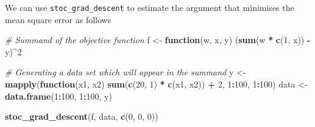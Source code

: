 \documentclass[12pt,]{article}
\newenvironment{Shaded}{\begin{snugshade}}{\end{snugshade}}
\newcommand{\CommentTok}[1]{\textcolor[rgb]{0.56,0.35,0.01}{\textit{#1}}}
\newcommand{\ControlFlowTok}[1]{\textcolor[rgb]{0.13,0.29,0.53}{\textbf{#1}}}
\newcommand{\DecValTok}[1]{\textcolor[rgb]{0.00,0.00,0.81}{#1}}
\newcommand{\KeywordTok}[1]{\textcolor[rgb]{0.13,0.29,0.53}{\textbf{#1}}}
\newcommand{\NormalTok}[1]{#1}
\newcommand{\OperatorTok}[1]{\textcolor[rgb]{0.81,0.36,0.00}{\textbf{#1}}}
\newcommand{\StringTok}[1]{\textcolor[rgb]{0.31,0.60,0.02}{#1}}
\begin{document}
We can use \texttt{stoc\_grad\_descent} to estimate the argument that
minimises the mean square error as follows

\begin{Shaded}
\begin{Highlighting}[]
    \CommentTok{# Summand of the objective function}
\NormalTok{    f <-}\StringTok{ }\ControlFlowTok{function}\NormalTok{(w, x, y) (}\KeywordTok{sum}\NormalTok{(w }\OperatorTok{*}\StringTok{ }\KeywordTok{c}\NormalTok{(}\DecValTok{1}\NormalTok{, x)) }\OperatorTok{-}\StringTok{ }\NormalTok{y)}\OperatorTok{^}\DecValTok{2}

    \CommentTok{# Generating a data set which will appear in the summand}
\NormalTok{    y <-}\StringTok{ }\KeywordTok{mapply}\NormalTok{(}\ControlFlowTok{function}\NormalTok{(x1, x2) }\KeywordTok{sum}\NormalTok{(}\KeywordTok{c}\NormalTok{(}\DecValTok{20}\NormalTok{, }\DecValTok{1}\NormalTok{) }\OperatorTok{*}\StringTok{ }\KeywordTok{c}\NormalTok{(x1, x2)) }\OperatorTok{+}\StringTok{ }\DecValTok{2}\NormalTok{, }\DecValTok{1}\OperatorTok{:}\DecValTok{100}\NormalTok{, }\DecValTok{1}\OperatorTok{:}\DecValTok{100}\NormalTok{)}
\NormalTok{    data <-}\StringTok{ }\KeywordTok{data.frame}\NormalTok{(}\DecValTok{1}\OperatorTok{:}\DecValTok{100}\NormalTok{, }\DecValTok{1}\OperatorTok{:}\DecValTok{100}\NormalTok{, y)}

    \KeywordTok{stoc_grad_descent}\NormalTok{(f, data, }\KeywordTok{c}\NormalTok{(}\DecValTok{0}\NormalTok{, }\DecValTok{0}\NormalTok{, }\DecValTok{0}\NormalTok{))}
\end{Highlighting}
\end{Shaded}
\end{document}
